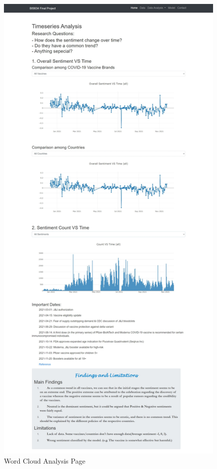 \documentclass{article}
\begin{document}
\begin{itemize}
\begin{figure}[H]
\begin{minipage}[H]{.5\textwidth}
      \caption{Word Cloud Analysis Page}
    \end{minipage}%
    \begin{minipage}[H]{.5\textwidth}
      \centering
      \includegraphics[width=\linewidth]{Timeseries.jpeg}

\end{minipage}
\end{figure}
\end{itemize}
\end{document}
